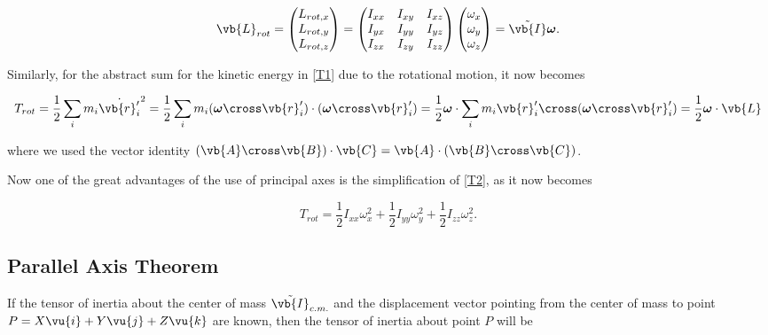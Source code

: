 \documentclass[a4paper,12pt]{report}
\begin{document}
\begin{equation}
	\vb{L}_{rot}  = 
	\begin{pmatrix}
	L_{rot,x} \\
	L_{rot,y} \\
	L_{rot,z} 
	\end{pmatrix}
	= \begin{pmatrix}
	I_{xx}  & I_{xy}  & I_{xz} \\
	I_{yx}  & I_{yy}  & I_{yz} \\
	I_{zx}  & I_{zy}  & I_{zz} 
	\end{pmatrix}
	\begin{pmatrix}
	\omega _{x} \\
	\omega _{y} \\
	\omega _{z} 
	\end{pmatrix}
	=\tilde{\vb{I} } \boldsymbol{\omega } .		
\end{equation}

Similarly, for the abstract sum for the kinetic energy in \cref{T1} due to the rotational motion, it now becomes

\begin{equation}
	T_{rot} = \frac{1}{2} \sum_{i}^{} m_{i} \dot{\vb{r} '_{i} } ^2 = \frac{1}{2} \sum_{i}^{} m_{i} (\boldsymbol{\omega } \cross \vb{r} '_{i} ) \cdot (\boldsymbol{\omega } \cross \vb{r} '_{i} ) = \frac{1}{2} \boldsymbol{\omega } \cdot \sum_{i}^{} m_{i} \vb{r} '_{i} \cross (\boldsymbol{\omega } \cross \vb{r} '_{i} ) = \frac{1}{2} \boldsymbol{\omega }  \cdot \vb{L}  \label{T2} 
\end{equation}

where we used the vector identity \((\vb{A} \cross \vb{B} )\cdot \vb{C} = \vb{A} \cdot (\vb{B} \cross \vb{C} )\). 

Now one of the great advantages of the use of principal axes is the simplification of \cref{T2}, as it now becomes  

\begin{equation}
	T_{rot} = \frac{1}{2} I_{xx} \omega _{x} ^2 + \frac{1}{2} I_{yy} \omega _{y} ^2 + \frac{1}{2} I_{zz} \omega _{z} ^2.  
\end{equation}

\subsection{Parallel Axis Theorem}

If the tensor of inertia about the center of mass \(\tilde{\vb{I} } _{c.m. } \) and the displacement vector pointing from the center of mass to point \(P = X \vu{i} + Y \vu{j} + Z\vu{k} \) are known, then the tensor of inertia about point \(P\) will be 
\end{document}
